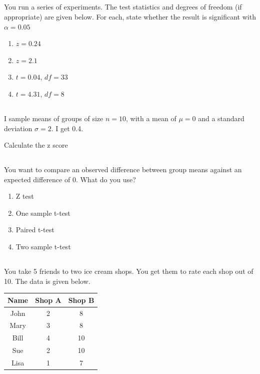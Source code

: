 \documentclass[twocolumn]{article}
\begin{document}
\subsection{}

You run a series of experiments. The test statistics and degrees of freedom (if appropriate) are given below. For each, state whether the result is significant with $\alpha = 0.05$

\begin{multicols}{2}
    \begin{enumerate}
        \item $z = 0.24 $
        \item $z = 2.1 $
        \item $t = 0.04$, $df = 33$
        \item $t = 4.31$, $df = 8$
    \end{enumerate}
\end{multicols}

\subsection{}

I sample means of groups of size $n = 10$, with a mean of $\mu = 0$ and a standard deviation $\sigma = 2$. I get 0.4.

Calculate the z score

\subsection{}

You want to compare an observed difference between group means against an expected difference of 0. What do you use?

\begin{enumerate}
    \item Z test
    \item One sample t-test
    \item Paired t-test
    \item Two sample t-test
\end{enumerate}

\subsection{}

You take 5 friends to two ice cream shops. You get them to rate each shop out of 10. The data is given below.

\begin{table}[h!]
    \centering
    \begin{tabular}{c | c | c }
        \toprule
        Name & Shop A & Shop B \\
        \midrule
        John & 2 & 8  \\
        Mary & 3 & 8  \\
        Bill & 4 & 10 \\
        Sue & 2 & 10 \\
        Lisa & 1 & 7 \\
        \bottomrule
    \end{tabular}
\end{table}
\end{document}
